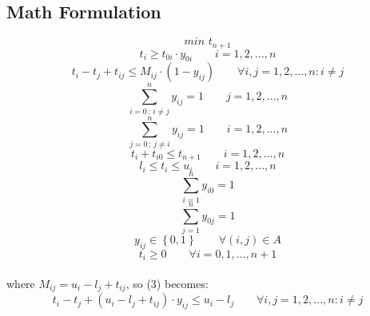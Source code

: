 \documentclass[a4paper,12pt,titlepage]{article}
\begin{document}
\subsection*{Math Formulation}
\begin{equation}
min\,\,t_{n+1}
\tag{1}
\end{equation}
\begin{equation}
t_i\geq t_{0i} \cdot y_{0i}\qquad i=1,2,...,n
\tag{2}
\end{equation}
\begin{equation}
t_i-t_{j}+t_{ij} \leq M_{ij}\cdot(1-y_{ij}) \qquad \forall i,j=1,2,...,n : i\neq j
\tag{3}
\end{equation}
\begin{equation}
\sum_{i=0\,:\,i\neq j}^{n}y_{ij} = 1\qquad j=1,2,...,n
\tag{4}
\end{equation}
\begin{equation}
\sum_{j=0\,:\,j\neq i}^{n}y_{ij} = 1\qquad i=1,2,...,n
\tag{5}
\end{equation}
\begin{equation}
t_i +t_{i0}\leq t_{n+1} \qquad i=1,2,...,n
\tag{6}
\end{equation}
\begin{equation}
l_i\leq t_i \leq u_i \qquad i=1,2,...,n
\tag{7}
\end{equation}
\begin{equation}
	\sum_{i=1}^{n}y_{i0} = 1
	\tag{8}
\end{equation}
\begin{equation}
	\sum_{j=1}^{n}y_{0j} = 1
	\tag{9}
\end{equation}
\begin{equation}
y_{ij} \in \left\lbrace 0,1\right\rbrace \qquad \forall (i,j)\in A
\tag{10}
\end{equation}
\begin{equation}
t_i \geq 0 \qquad \forall i=0,1,...,n+1
\tag{11}
\end{equation}
\\
where $ M_{ij} = u_i - l_j + t_{ij}$, so (3) becomes:
\begin{equation*}
t_i-t_j + (u_i-l_j+t_{ij})\cdot y_{ij} \leq u_i - l_j \qquad \forall i,j=1,2,...,n : i\neq j
\end{equation*}
\end{document}
